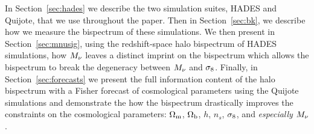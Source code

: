 In Section~\ref{sec:hades} we describe the two simulation suites, HADES and Quijote, 
that we use throughout the paper. Then in Section~\ref{sec:bk}, we describe how 
we measure the bispectrum of these simulations. We then present in Section~\ref{sec:mnusig}, 
using the redshift-space halo bispectrum of HADES simulations, how $M_\nu$ leaves 
a distinct imprint on the bispectrum which allows the bispectrum to break the 
degeneracy between $M_\nu$ and $\sigma_8$. Finally, in Section~\ref{sec:forecasts} 
we present the full information content of the halo bispectrum with a Fisher 
forecast of cosmological parameters using the Quijote simulations and demonstrate 
the how the bispectrum drastically improves the constraints on the cosmological 
parameters: $\Omega_{\rm m}$, $\Omega_{\rm b}$, $h$, $n_s$, $\sigma_8$, and {\em especially} $M_\nu$. 


